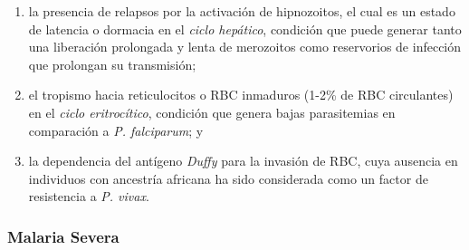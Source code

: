 \documentclass[a4paper]{article}
\providecommand{\tightlist}{%
  \setlength{\itemsep}{0pt}\setlength{\parskip}{0pt}}
\begin{document}
\begin{enumerate}
\begin{enumerate}
    \begin{enumerate}
    \def\labelenumiii{\arabic{enumiii}.}
    \tightlist
    \item
      la presencia de relapsos por la activación de hipnozoitos, el cual
      es un estado de latencia o dormacia en el \emph{ciclo hepático},
      condición que puede generar tanto una liberación prolongada y
      lenta de merozoitos como reservorios de infección que prolongan su
      transmisión;
    \item
      el tropismo hacia reticulocitos o RBC inmaduros (1-2\% de RBC
      circulantes) en el \emph{ciclo eritrocítico}, condición que genera
      bajas parasitemias en comparación a \emph{P. falciparum}; y
    \item
      la dependencia del antígeno \emph{Duffy} para la invasión de RBC,
      cuya ausencia en individuos con ancestría africana ha sido
      considerada como un factor de resistencia a \emph{P. vivax}. 
    \end{enumerate}
  \end{enumerate}
\end{enumerate}

\subsubsection{Malaria Severa}\label{malaria-severa}
\end{document}
